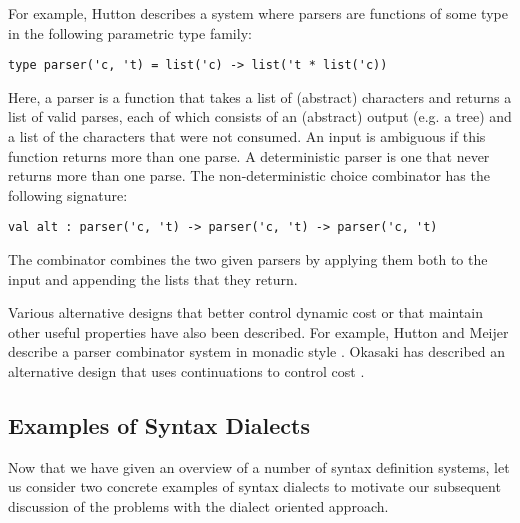 For example, Hutton describes a system where parsers are functions of some type in the following parametric type family:%
\begin{lstlisting}[numbers=none]
type parser('c, 't) = list('c) -> list('t * list('c))
\end{lstlisting}
Here, a parser is a function that takes a list of (abstract) characters and returns a list of valid parses, each of which consists of an (abstract) output (e.g. a tree) and a list of the characters that were not consumed. An input is ambiguous if this function returns more than one parse. A deterministic parser is one that never returns more than one parse. The  non-deterministic choice combinator  has the following signature: 
\begin{lstlisting}[numbers=none]
val alt : parser('c, 't) -> parser('c, 't) -> parser('c, 't)
\end{lstlisting}
The  combinator combines the two given parsers by applying them both to the input and appending the lists that they return.

Various alternative designs that better control dynamic cost or that maintain other useful properties have also been described. For example, Hutton and Meijer describe a parser combinator system in monadic style \cite{hutton1998monadic}. Okasaki has described an alternative design that uses continuations to control cost \cite{Okasaki98b}.



\subsection{Examples of Syntax Dialects}\label{sec:examples-of-syntax-dialects}
Now that we have given an overview of a number of syntax definition systems, let us consider two concrete examples of syntax dialects to motivate our subsequent discussion of the problems with the dialect oriented approach.

